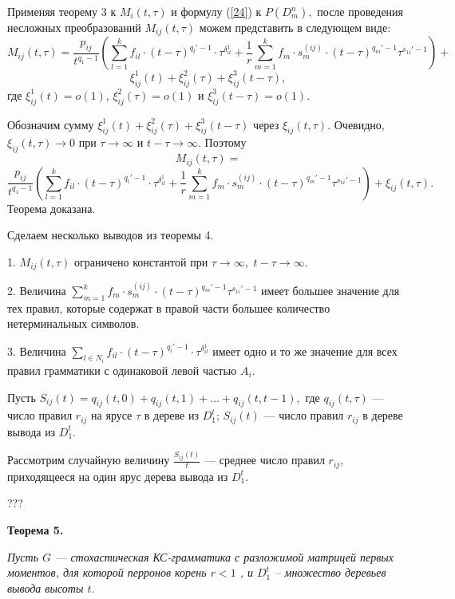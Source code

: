\documentclass[12pt,russian]{article}
\begin{document}
{Применяя теорему 3 к $M_i(t,\tau)$ и формулу (\ref{24}) к $P(D_m^{n}),$ после проведения несложных преобразований
$M_{ij}(t,\tau)$ можем представить в следующем виде:
$$
M_{ij}(t,\tau)=
\frac{p_{ij}}{t^{q_1-1}} \left(\sum_{l =1}^k f_{il} \cdot (t-\tau)^{q_l'-1}\cdot \tau^{\delta_{il}^1}+ 
\frac{1}{{r }} \sum_{m=1}^k f_m\cdot s_m^{(ij)}\cdot
 (t-\tau)^{q_m'-1}\tau^{s_{1i}'-1}\right)+
$$
$$
\xi^1_{ij}(t)+\xi^2_{ij}(\tau)+\xi^3_{ij}(t-\tau),
$$
где $\xi^1_{ij}(t)=o(1)$, $\xi^2_{ij}(\tau)=o(1)$ и
$\xi^3_{ij}(t-\tau)=o(1).$

Обозначим сумму $\xi^1_{ij}(t)+\xi^2_{ij}(\tau)+\xi^3_{ij}(t-\tau)$ через
$\xi_{ij}(t,\tau).$ 
Очевидно, $\xi_{ij}(t,\tau) \rightarrow 0$ при
$\tau \rightarrow \infty$ и $t-\tau \rightarrow \infty.$
Поэтому 
$$
M_{ij}(t,\tau) =
$$
\begin{equation}
\frac{p_{ij}}{t^{q_1-1}} \left(\sum_{l =1}^k f_{il} \cdot (t-\tau)^{q_l'-1}\cdot \tau^{\delta_{il}^1}+ 
\frac{1}{{r }} \sum_{m=1}^k f_m\cdot s_m^{(ij)}\cdot
 (t-\tau)^{q_m'-1}\tau^{s_{1i}'-1}\right)+ \xi_{ij}(t,\tau). 
\label{34}
\end{equation}
Теорема доказана.

\medskip

Сделаем несколько выводов из теоремы 4.

1. $M_{ij}(t,\tau)$ ограничено константой
при $\tau \rightarrow \infty,$ $t-\tau \rightarrow \infty.$

2. Величина $\sum_{m=1}^k f_m \cdot s_m^{(ij)}\cdot
 (t-\tau)^{q_m'-1}\tau^{s_{1i}'-1}$ имеет большее значение для тех правил, которые
содержат в правой части большее количество нетерминальных символов.

3. Величина $\sum_{l \in N_i} f_{il} \cdot (t-\tau)^{q_l'-1}\cdot \tau^{\delta_{il}^1}$ имеет одно и то же значение для всех
правил грамматики с одинаковой левой частью $A_i.$

\medskip

Пусть $S_{ij}(t)=q_{ij}(t,0)+q_{ij}(t,1)+\ldots +q_{ij}(t,t-1),$
где $q_{ij}(t,\tau)$ --- число правил $r_{ij}$ на ярусе $\tau$ в дереве
из $D_1^t$; $S_{ij}(t)$ --- число правил $r_{ij}$ в дереве вывода из $D_1^t$.

Рассмотрим случайную величину $\frac{S_{ij}(t)}{t}$ --- среднее число правил $r_{ij}$,
приходящееся на один ярус дерева вывода из $D_1^t.$

\medskip
???

\textbf{Теорема 5.}
{\em Пусть $G$ --- стохастическая КС-грамматика с разложимой
матрицей первых моментов, для которой перронов корень $r<1$ , и $D^t_1$ -- множество деревьев вывода
высоты $t.$

}}
\end{document}
